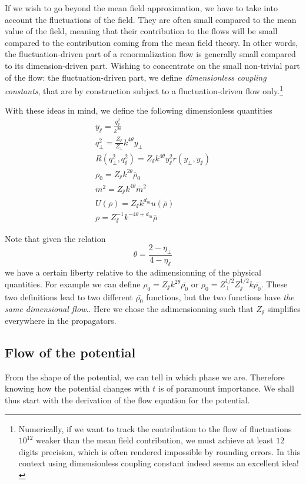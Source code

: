 If we wish to go beyond the mean field approximation, we have to take into account the fluctuations of the field.
They are often small compared to the mean value of the field, meaning that their contribution to the flows will be small compared to the contribution coming from the mean field theory. In other words, the fluctuation-driven part of a renormalization flow is generally small compared to its dimension-driven part. 
Wishing to concentrate on the small non-trivial part of the flow: the fluctuation-driven part, we define \textit{dimensionless coupling constants}, that are by construction subject to a fluctuation-driven flow only.\footnote{Numerically, if we want to track the contribution to the flow of fluctuations $10^{12}$ weaker than the mean field contribution, we must achieve at least $12$ digits precision, which is often rendered impossible by rounding errors. In this context using dimensionless coupling constant indeed seems an excellent idea!}

With these ideas in mind, we define the following dimensionless quantities 
\begin{align}
 y_\sslash = \frac{q_\sslash^2}{k^{2\theta}} \\
q_\perp^2 = \frac{Z_\sslash}{Z_\perp} k^{4\theta} y_\perp \\
R(q_\perp^2,q_\sslash^2) = Z_\sslash k^{4\theta} y_\sslash^2 r(y_\perp, y_\sslash) \\
\rho_0 = Z_\sslash k^{2\theta} \bar \rho_0 \\
m^2 = Z_\sslash k^{4\theta} \bar{m}^2 \\
U(\rho) = Z_\sslash k^{d_m} u(\bar{\rho}) \\
\rho = Z_\sslash^{-1} k^{-4\theta + d_m} \bar{\rho}
\end{align}

Note that given the relation
\begin{equation}
\theta = \frac{2-\eta_\perp}{4-\eta_\sslash}
\end{equation}
we have a certain liberty relative to the adimensionning of the physical quantities. For example we can define $\rho_0 = Z_\sslash k^{2\theta} \bar{\rho_0}$ or $\rho_0 = Z_\perp^{1/2}Z_\sslash^{1/2}k\bar{\rho_0}$. These two definitions lead to two different $\bar{\rho_0}$ functions, but the two functions have \textit{the same dimensional flow}.. Here we chose the adimensionning such that $Z_\sslash$ simplifies everywhere in the propagators. 

\subsection{Flow of the potential}
From the shape of the potential, we can tell in which phase we are. Therefore knowing how the potential changes with $t$ is of paramount importance. We shall thus start with the derivation of the flow equation for the potential.

